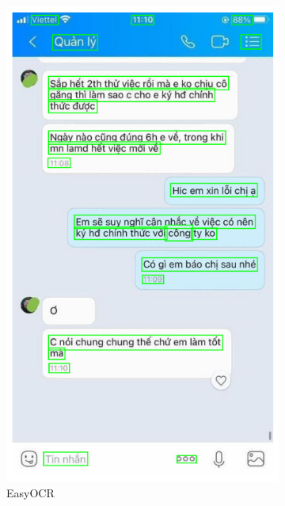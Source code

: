 \documentclass[11pt]{article}
\begin{document}
\begin{figure}[h!]
\begin{subfigure}{0.3\linewidth}
        \includegraphics[width=\linewidth]{__results___10_2.png}
        \caption{EasyOCR}
    \end{subfigure}
    \hfill
    \begin{subfigure}{0.3\linewidth}

\end{subfigure}
\end{figure}
\end{document}
